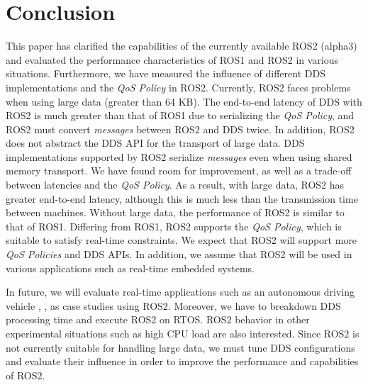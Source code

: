 \documentclass{sig-alternate-05-2015}
\begin{document}
\section{Conclusion}
\label{sec:orgheadline4}

This paper has clarified the capabilities of the currently available ROS2 (alpha3) and evaluated the performance characteristics of ROS1 and ROS2 in various situations.
Furthermore, we have measured the influence of different DDS implementations and the \emph{QoS Policy} in ROS2.
Currently, ROS2 faces problems when using large data (greater than 64 KB).
The end-to-end latency of DDS with ROS2 is much greater than that of ROS1 due to serializing the \emph{QoS Policy}, and ROS2 must convert \emph{messages} between ROS2 and DDS twice.
In addition, ROS2 does not abstract the DDS API for the transport of large data. 
DDS implementations supported by ROS2 serialize \emph{messages} even when using shared memory transport.
We have found room for improvement, as well as a trade-off between latencies and the \emph{QoS Policy}.
As a result, with large data, ROS2 has greater end-to-end latency, although this is much less than the transmission time between machines.
Without large data, the performance of ROS2 is similar to that of ROS1.
Differing from ROS1, ROS2 supports the \emph{QoS Policy}, which is suitable to satisfy real-time constraints.
We expect that ROS2 will support more \emph{QoS Policies} and DDS APIs.
In addition, we assume that ROS2 will be used in various applications such as real-time embedded systems.

In future, we will evaluate real-time applications such as an autonomous driving vehicle \cite{kato2015open}, \cite{saito2014fusion}, as case studies using ROS2. 
Moreover, we have to breakdown DDS processing time and execute ROS2 on RTOS.
ROS2 behavior in other experimental situations such as high CPU load are also interested.
Since ROS2 is not currently suitable for handling large data, we must tune DDS configurations and evaluate their influence in order to improve the performance and capabilities of ROS2.



\end{document}
